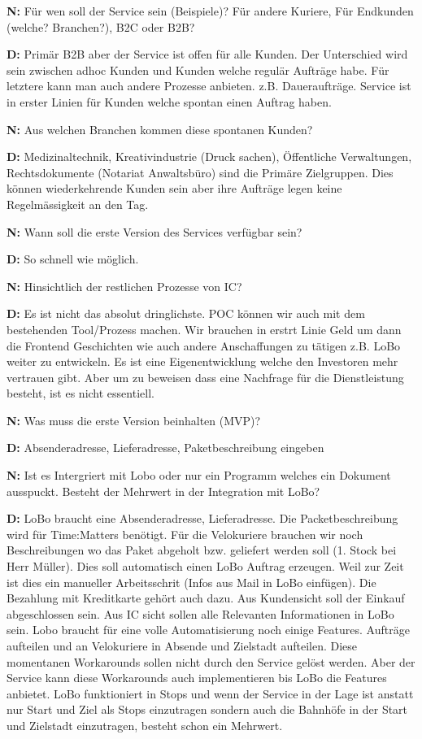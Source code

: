 \textbf{N:} Für wen soll der Service sein (Beispiele)? Für andere Kuriere, Für Endkunden (welche? Branchen?), B2C oder B2B?

\textbf{D:}  Primär B2B aber der Service ist offen für alle Kunden. Der Unterschied wird sein zwischen adhoc Kunden und Kunden welche regulär Aufträge habe. Für letztere kann man auch andere Prozesse anbieten. z.B. Daueraufträge. Service ist in erster Linien für Kunden welche spontan einen Auftrag haben.

\textbf{N:} Aus welchen Branchen kommen diese spontanen Kunden?

\textbf{D:} Medizinaltechnik, Kreativindustrie (Druck sachen), Öffentliche Verwaltungen, Rechtsdokumente (Notariat Anwaltsbüro) sind die Primäre Zielgruppen. Dies können wiederkehrende Kunden sein aber ihre Aufträge legen keine Regelmässigkeit an den Tag.

\textbf{N:} Wann soll die erste Version des Services verfügbar sein?

\textbf{D:} So schnell wie möglich.

\textbf{N:} Hinsichtlich der restlichen Prozesse von IC?

\textbf{D:} Es ist nicht das absolut dringlichste. POC können wir auch mit dem bestehenden Tool/Prozess machen. Wir brauchen in erstrt Linie Geld um dann die Frontend Geschichten wie auch andere Anschaffungen zu tätigen z.B. LoBo weiter zu entwickeln. Es ist eine Eigenentwicklung welche den Investoren mehr vertrauen gibt. Aber um zu beweisen dass eine Nachfrage für die Dienstleistung besteht, ist es nicht essentiell.

\textbf{N:} Was muss die erste Version beinhalten (MVP)?

\textbf{D:} Absenderadresse, Lieferadresse, Paketbeschreibung eingeben

\textbf{N:} Ist es Intergriert mit Lobo oder nur ein Programm welches ein Dokument ausspuckt. Besteht der Mehrwert in der Integration mit LoBo?

\textbf{D:} LoBo braucht eine Absenderadresse, Lieferadresse. Die Packetbeschreibung wird für Time:Matters benötigt. Für die Velokuriere brauchen wir noch Beschreibungen wo das Paket abgeholt bzw. geliefert werden soll (1. Stock bei Herr Müller). Dies soll automatisch einen LoBo Auftrag erzeugen. Weil zur Zeit ist dies ein manueller Arbeitsschrit (Infos aus Mail in LoBo einfügen). Die Bezahlung mit Kreditkarte gehört auch dazu. Aus Kundensicht soll der Einkauf abgeschlossen sein. Aus IC sicht sollen alle Relevanten Informationen in LoBo sein. Lobo braucht für eine volle Automatisierung noch einige Features. Aufträge aufteilen und an Velokuriere in Absende und Zielstadt aufteilen. Diese momentanen Workarounds sollen nicht durch den Service gelöst werden. Aber der Service kann diese Workarounds auch implementieren bis LoBo die Features anbietet. LoBo funktioniert in Stops und wenn der Service in der Lage ist anstatt nur Start und Ziel als Stops einzutragen sondern auch die Bahnhöfe in der Start und Zielstadt einzutragen, besteht schon ein Mehrwert.

